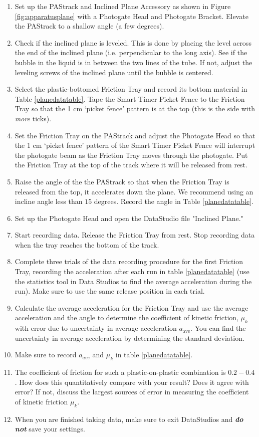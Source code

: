 \begin{enumerate}
    \item Set up the PAStrack and Inclined Plane Accessory as shown in Figure \ref{fig:apparatusplane} with a Photogate Head and Photogate Bracket. Elevate the PAStrack to a shallow angle (a few degrees).
    \item Check if the inclined plane is leveled.  This is done by placing the level across the end of the inclined plane (i.e. perpendicular to the long axis).  See if the bubble in the liquid is in between the two lines of the tube.  If not, adjust the leveling screws of the inclined plane until the bubble is centered.
    \item Select the plastic-bottomed Friction Tray and record its bottom material in Table \ref{planedatatable}. Tape the Smart Timer Picket Fence to the Friction Tray so that the 1 cm `picket fence' pattern is at the top (this is the side with {\it{more}} ticks).
    \item Set the Friction Tray on the PAStrack and adjust the Photogate Head so that the 1 cm `picket fence' pattern of the Smart Timer Picket Fence will interrupt the photogate beam as the Friction Tray moves through the photogate.  Put the Friction Tray at the top of the track where it will be released from rest.
    \item Raise the angle of the the PAStrack so that when the Friction Tray is released from the top, it accelerates down the plane. We recommend using an incline angle less than $15$ degrees. Record the angle in Table \ref{planedatatable}.
    \item Set up the Photogate Head and open the DataStudio file "Inclined Plane."
    \item Start recording data.  Release the Friction Tray from rest.  Stop recording data when the tray reaches the bottom of the track.
    \item Complete three trials of the data recording procedure for the first Friction Tray, recording the acceleration after each run in table \ref{planedatatable} (use the statistics tool in Data Studios to find the average acceleration during the run). Make sure to use the same release position in each trial.
    \item Calculate the average acceleration for the Friction Tray and use the average acceleration and the angle to determine the coefficient of kinetic friction, $\mu_k$ with error due to uncertainty in average acceleration $a_\text{ave}$. You can find the uncertainty in average acceleration by determining the standard deviation.
    \item  Make sure to record $a_{ave}$ and $\mu_k$ in table \ref{planedatatable}.
    \item The coefficient of friction for such a plastic-on-plastic combination is $0.2-0.4$.  How does this quantitatively compare with your result? Does it agree with error? If not, discuss the largest sources of error in measuring the coefficient of kinetic friction $\mu_k$.
    \item When you are finished taking data, make sure to exit DataStudios and {\bf{\it{do not}}} save your settings.
\end{enumerate}
